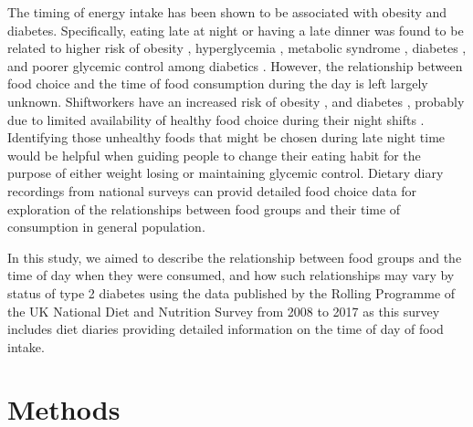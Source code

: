 \documentclass{bmcart}
\begin{document}
The timing of energy intake has been shown to be associated with obesity and diabetes. \cite{almoosawi2016chrono} Specifically, eating late at night or having a late dinner was found to be related to higher risk of obesity \cite{xiao2019meal,yoshida2018association}, hyperglycemia \cite{nakajima2015association}, metabolic syndrome \cite{kutsuma2014potential}, diabetes \cite{mattson2014meal}, and poorer glycemic control among diabetics \cite{sakai2017late}. However, the relationship between food choice and the time of food consumption during the day is left largely unknown. Shiftworkers have an increased risk of obesity \cite{balieiro2014nutritional,barbadoro2013rotating}, and diabetes \cite{pan2011rotating}, probably due to limited availability of healthy food choice during their night shifts \cite{bonnell2017influences,balieiro2014nutritional}. Identifying those unhealthy foods that might be chosen during late night time would be helpful when guiding people to change their eating habit for the purpose of either weight losing or maintaining glycemic control. Dietary diary recordings from national surveys can provid detailed food choice data for exploration of the relationships between food groups and their time of consumption in general population.

In this study, we aimed to describe the relationship between food groups and the time of day when they were consumed, and how such relationships may vary by status of type 2 diabetes using the data published by the Rolling Programme of the UK National Diet and Nutrition Survey from 2008 to 2017 as this survey includes diet diaries providing detailed information on the time of day of food intake.

\section*{Methods}
\end{document}
